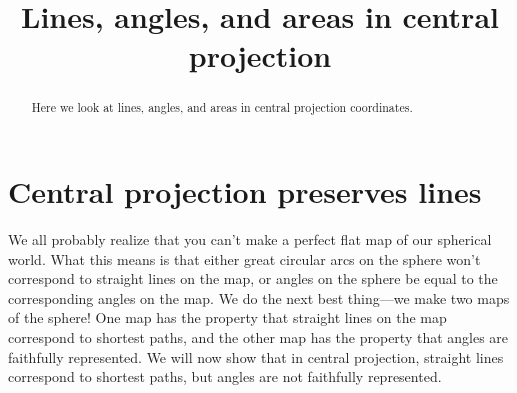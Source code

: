 \documentclass[newpage,hints,handout]{ximera}
\title{Lines, angles, and areas in central projection}
\begin{document}
\begin{abstract}
  Here we look at lines, angles, and areas in central projection coordinates. 
\end{abstract}
\maketitle

\section{Central projection preserves lines}

We all probably realize that you can't make a perfect flat map of our
spherical world.  What this means is that either great circular arcs
on the sphere won't correspond to straight lines on the map, or angles
on the sphere be equal to the corresponding angles on the map.  We do
the next best thing---we make two maps of the sphere!  One map has the
property that straight lines on the map correspond to shortest paths,
and the other map has the property that angles are faithfully
represented. We will now show that in central projection, straight
lines correspond to shortest paths, but angles are not faithfully
represented.
\end{document}
